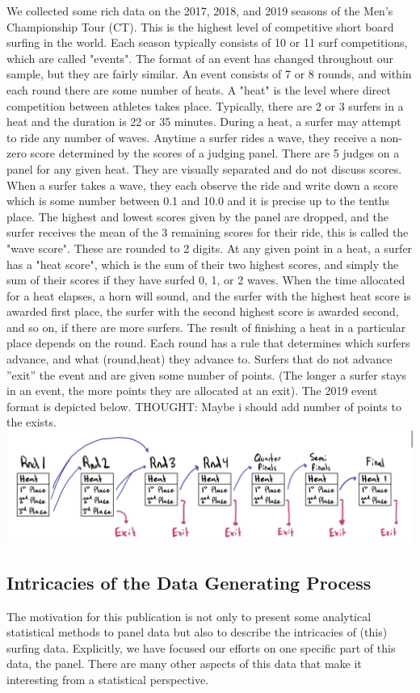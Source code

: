 \documentclass{article}
\begin{document}
We collected some rich data on the 2017, 2018, and 2019 seasons of the Men's Championship Tour (CT). This is the highest level of competitive short board surfing in the world. Each season typically consists of 10 or 11 surf competitions, which are called "events". The format of an event has changed throughout our sample, but they are fairly similar. An event consists of 7 or 8 rounds, and within each round there are some number of heats. A "heat" is the level where direct competition between athletes takes place. Typically, there are 2 or 3 surfers in a heat and the duration is 22 or 35 minutes. During a heat, a surfer may attempt to ride any number of waves. Anytime a surfer rides a wave, they receive a non-zero score determined by the scores of a judging panel. There are 5 judges on a panel for any given heat. They are visually separated and do not discuss scores. When a surfer takes a wave, they each observe the ride and write down a score which is some number between 0.1 and 10.0 and it is precise up to the tenths place. The highest and lowest scores given by the panel are dropped, and the surfer receives the mean of the 3 remaining scores for their ride, this is called the "wave score". These are rounded to 2 digits. At any given point in a heat, a surfer has a "heat score", which is the sum of their two highest scores, and simply the sum of their scores if they have surfed 0, 1, or 2 waves. When the time allocated for a heat elapses, a horn will sound, and the surfer with the highest heat score is awarded first place, the surfer with the second highest score is awarded second, and so on, if there are more surfers. The result of finishing a heat in a particular place depends on the round.  Each round has a rule that determines which surfers advance, and what (round,heat) they advance to.  Surfers that do not advance ”exit” the event and are given some number of points. (The longer a surfer stays in an event, the more points they are allocated at an exit). The 2019 event format is depicted below.
THOUGHT: Maybe i should add number of points to the exists.
\includegraphics[width=\textwidth]{./visuals/2019EvtFormat.jpeg}

\subsection{Intricacies of the Data Generating Process}
The motivation for this publication is not only to present some analytical statistical methods to panel data but also to describe the intricacies of (this) surfing data. Explicitly, we have focused our efforts on one specific part of this data, the panel. There are many other aspects of this data that make it interesting from a statistical perspective.
\end{document}
